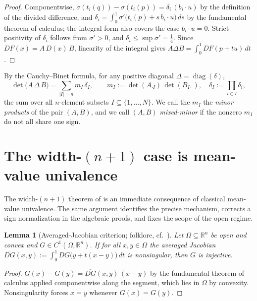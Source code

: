 \documentclass[11pt]{article}
\newtheorem{lemma}[theorem]{Lemma}
\theoremstyle{definition}
\theoremstyle{remark}
\newcommand{\R}{\mathbb{R}}
\begin{document}
\begin{proof}
Componentwise, $\sigma(t_i(q))-\sigma(t_i(p))=\delta_i\,(b_i\cdot u)$ by
the definition of the divided difference, and
$\delta_i=\int_0^1\sigma'\bigl(t_i(p)+s\,b_i\cdot u\bigr)\,ds$ by the
fundamental theorem of calculus; the integral form also covers the case
$b_i\cdot u=0$. Strict positivity of $\delta_i$ follows from
$\sigma'>0$, and $\delta_i\le\sup\sigma'=\tfrac14$. Since
$DF(x)=A\,D(x)\,B$, linearity of the integral gives
$A\Delta B=\int_0^1 DF(p+tu)\,dt$.
\end{proof}

By the Cauchy--Binet formula, for any positive diagonal
$\Delta=\operatorname{diag}(\delta)$,
\begin{equation}\label{eq:cb}
\det\bigl(A\,\Delta\,B\bigr)
=\sum_{|I|=n} m_I\,\delta_I,
\qquad
m_I:=\det(A_{\cdot I})\,\det(B_{I\cdot}),
\quad
\delta_I:=\prod_{i\in I}\delta_i,
\end{equation}
the sum over all $n$-element subsets $I\subseteq\{1,\dots,N\}$. We call the
$m_I$ the \emph{minor products} of the pair $(A,B)$, and we call $(A,B)$
\emph{mixed-minor} if the nonzero $m_I$ do not all share one sign.

\section{The width-\texorpdfstring{$(n{+}1)$}{(n+1)} case is mean-value univalence}
\label{sec:comment}

The width-$(n+1)$ theorem of \cite{moonshine} is an immediate consequence of classical
mean-value univalence. The same argument identifies the precise mechanism, corrects a sign
normalization in the algebraic proofs, and fixes the scope of the open regime.

\begin{lemma}[Averaged-Jacobian criterion; folklore, cf.\
\cite{mcleod,parthasarathy,fmr}]\label{lem:mv}
Let $\Omega\subseteq\R^n$ be open and convex and $G\in C^1(\Omega,\R^n)$.
If for all $x,y\in\Omega$ the averaged Jacobian
$\overline{DG}(x,y):=\int_0^1 DG\bigl(y+t(x-y)\bigr)\,dt$ is nonsingular,
then $G$ is injective.
\end{lemma}
\begin{proof}
$G(x)-G(y)=\overline{DG}(x,y)\,(x-y)$ by the fundamental theorem of
calculus applied componentwise along the segment, which lies in $\Omega$ by
convexity. Nonsingularity forces $x=y$ whenever $G(x)=G(y)$.
\end{proof}
\end{document}
